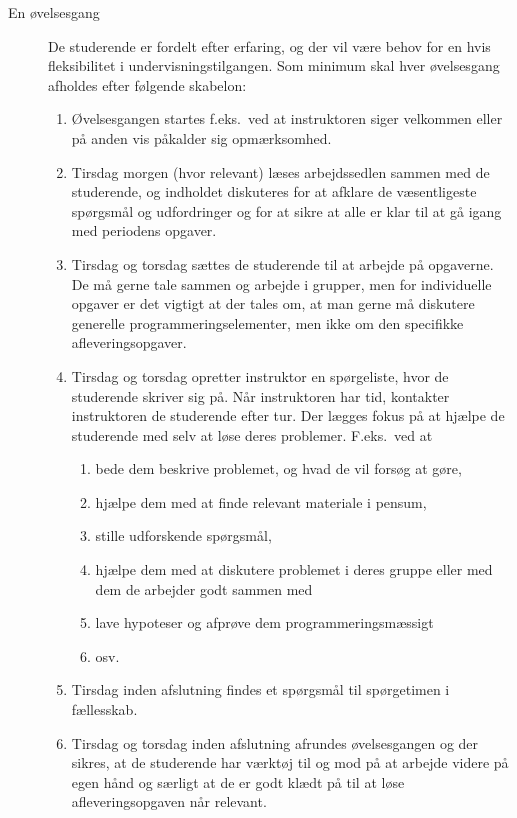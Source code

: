 \documentclass[a4paper]{article}
\begin{document}
\begin{description}
\item[En øvelsesgang] De studerende er fordelt efter erfaring, og der
  vil være behov for en hvis fleksibilitet i undervisningstilgangen.
  Som minimum skal hver øvelsesgang afholdes efter følgende skabelon:
  \begin{enumerate}
  \item Øvelsesgangen startes f.eks.\ ved at instruktoren siger
    velkommen eller på anden vis påkalder sig opmærksomhed.
  \item Tirsdag morgen (hvor relevant) læses arbejdssedlen sammen med
    de studerende, og indholdet diskuteres for at afklare de
    væsentligeste spørgsmål og udfordringer og for at sikre at alle er
    klar til at gå igang med periodens opgaver.
  \item Tirsdag og torsdag sættes de studerende til at arbejde på
    opgaverne. De må gerne tale sammen og arbejde i grupper, men for
    individuelle opgaver er det vigtigt at der tales om, at man gerne
    må diskutere generelle programmeringselementer, men ikke om den
    specifikke afleveringsopgaver.
  \item Tirsdag og torsdag opretter instruktor en spørgeliste, hvor de studerende skriver
    sig på. Når instruktoren har tid, kontakter instruktoren de
    studerende efter tur. Der lægges fokus på at hjælpe de studerende
    med selv at løse deres problemer. F.eks.\ ved at
    \begin{enumerate}
    \item bede dem beskrive problemet, og hvad de vil forsøg at gøre,
    \item hjælpe dem med at finde relevant materiale i pensum,
    \item stille udforskende spørgsmål, 
    \item hjælpe dem med at diskutere problemet i deres gruppe eller
      med dem de arbejder godt sammen med
    \item lave hypoteser og afprøve dem programmeringsmæssigt
    \item osv.
    \end{enumerate}
  \item Tirsdag inden afslutning findes et spørgsmål til spørgetimen i
    fællesskab.
  \item Tirsdag og torsdag inden afslutning afrundes øvelsesgangen og
    der sikres, at de studerende har værktøj til og mod på at arbejde
    videre på egen hånd og særligt at de er godt klædt på til at løse
    afleveringsopgaven når relevant.
  \end{enumerate}
  

\end{description}
\end{document}
